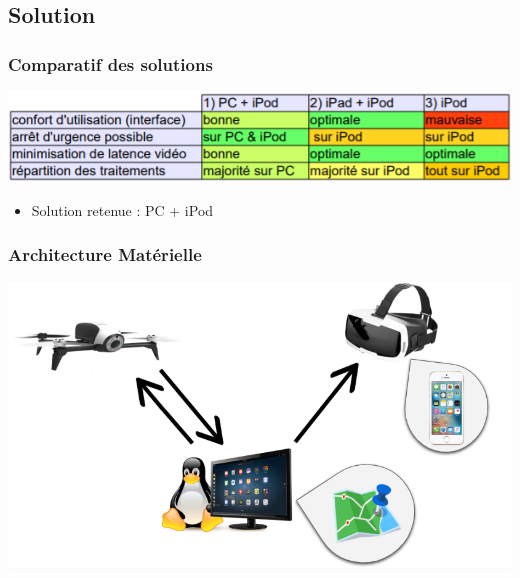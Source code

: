 \documentclass{beamer}
\begin{document}

	\begin{frame}
		\section{Solution}
		\begin{center}
		\frametitle{Comparatif des solutions}
       
        \includegraphics[scale=0.9]{comparatif_v3.PNG}
        \begin{itemize}
            \item Solution retenue : PC + iPod\\
        \end{itemize}
		\end{center}
	\end{frame}
	

	\begin{frame}
		\begin{center}
		\frametitle{Architecture Matérielle}
       
        \includegraphics[scale=0.6]{shcema_archi.png}
		\end{center}
	\end{frame}
	
\end{document}
